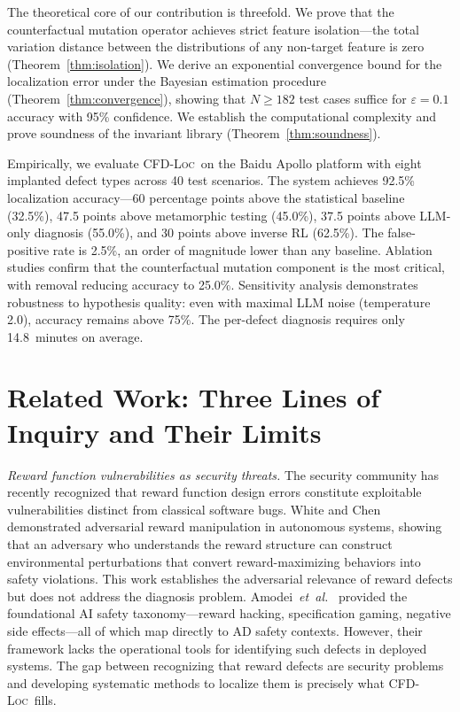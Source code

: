 \documentclass[journal]{IEEEtran}
\theoremstyle{plain}
\newcommand{\methodname}{\textsc{CFD-Loc}}
\begin{document}
The theoretical core of our contribution is threefold. We prove that the counterfactual mutation operator achieves strict feature isolation---the total variation distance between the distributions of any non-target feature is zero (Theorem~\ref{thm:isolation}). We derive an exponential convergence bound for the localization error under the Bayesian estimation procedure (Theorem~\ref{thm:convergence}), showing that $N \geq 182$ test cases suffice for $\varepsilon=0.1$ accuracy with 95\% confidence. We establish the computational complexity and prove soundness of the invariant library (Theorem~\ref{thm:soundness}).

Empirically, we evaluate \methodname\ on the Baidu Apollo platform with eight implanted defect types across 40 test scenarios. The system achieves 92.5\% localization accuracy---60 percentage points above the statistical baseline (32.5\%), 47.5 points above metamorphic testing (45.0\%), 37.5 points above LLM-only diagnosis (55.0\%), and 30 points above inverse RL (62.5\%). The false-positive rate is 2.5\%, an order of magnitude lower than any baseline. Ablation studies confirm that the counterfactual mutation component is the most critical, with removal reducing accuracy to 25.0\%. Sensitivity analysis demonstrates robustness to hypothesis quality: even with maximal LLM noise (temperature 2.0), accuracy remains above 75\%. The per-defect diagnosis requires only 14.8~minutes on average.

\section{Related Work: Three Lines of Inquiry and Their Limits}

\emph{Reward function vulnerabilities as security threats.} The security community has recently recognized that reward function design errors constitute exploitable vulnerabilities distinct from classical software bugs. White and Chen~\cite{white2023adversarial} demonstrated adversarial reward manipulation in autonomous systems, showing that an adversary who understands the reward structure can construct environmental perturbations that convert reward-maximizing behaviors into safety violations. This work establishes the adversarial relevance of reward defects but does not address the diagnosis problem. Amodei~\emph{et~al.}~\cite{amodei2016specification} provided the foundational AI safety taxonomy---reward hacking, specification gaming, negative side effects---all of which map directly to AD safety contexts. However, their framework lacks the operational tools for identifying such defects in deployed systems. The gap between recognizing that reward defects are security problems and developing systematic methods to localize them is precisely what \methodname\ fills.
\end{document}
